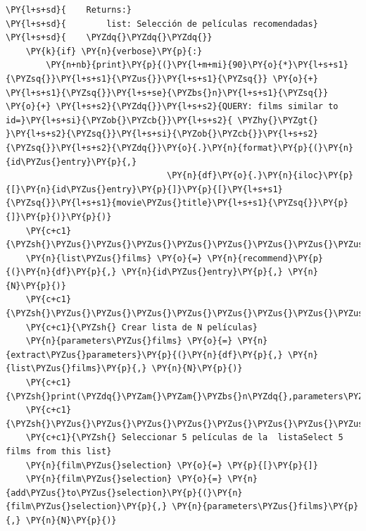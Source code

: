 \begin{tcolorbox}[breakable, size=fbox, boxrule=1pt, pad at break*=1mm,colback=cellbackground, colframe=cellborder]
\begin{Verbatim}[commandchars=\\\{\}]
\PY{l+s+sd}{    Returns:}
\PY{l+s+sd}{        list: Selección de películas recomendadas}
\PY{l+s+sd}{    \PYZdq{}\PYZdq{}\PYZdq{}}
    \PY{k}{if} \PY{n}{verbose}\PY{p}{:} 
        \PY{n+nb}{print}\PY{p}{(}\PY{l+m+mi}{90}\PY{o}{*}\PY{l+s+s1}{\PYZsq{}}\PY{l+s+s1}{\PYZus{}}\PY{l+s+s1}{\PYZsq{}} \PY{o}{+} \PY{l+s+s1}{\PYZsq{}}\PY{l+s+se}{\PYZbs{}n}\PY{l+s+s1}{\PYZsq{}} \PY{o}{+} \PY{l+s+s2}{\PYZdq{}}\PY{l+s+s2}{QUERY: films similar to id=}\PY{l+s+si}{\PYZob{}\PYZcb{}}\PY{l+s+s2}{ \PYZhy{}\PYZgt{} }\PY{l+s+s2}{\PYZsq{}}\PY{l+s+si}{\PYZob{}\PYZcb{}}\PY{l+s+s2}{\PYZsq{}}\PY{l+s+s2}{\PYZdq{}}\PY{o}{.}\PY{n}{format}\PY{p}{(}\PY{n}{id\PYZus{}entry}\PY{p}{,}
                                \PY{n}{df}\PY{o}{.}\PY{n}{iloc}\PY{p}{[}\PY{n}{id\PYZus{}entry}\PY{p}{]}\PY{p}{[}\PY{l+s+s1}{\PYZsq{}}\PY{l+s+s1}{movie\PYZus{}title}\PY{l+s+s1}{\PYZsq{}}\PY{p}{]}\PY{p}{)}\PY{p}{)}
    \PY{c+c1}{\PYZsh{}\PYZus{}\PYZus{}\PYZus{}\PYZus{}\PYZus{}\PYZus{}\PYZus{}\PYZus{}\PYZus{}\PYZus{}\PYZus{}\PYZus{}\PYZus{}\PYZus{}\PYZus{}\PYZus{}\PYZus{}\PYZus{}\PYZus{}\PYZus{}\PYZus{}\PYZus{}\PYZus{}\PYZus{}\PYZus{}\PYZus{}\PYZus{}\PYZus{}\PYZus{}\PYZus{}\PYZus{}\PYZus{}\PYZus{}\PYZus{}\PYZus{}\PYZus{}}
    \PY{n}{list\PYZus{}films} \PY{o}{=} \PY{n}{recommend}\PY{p}{(}\PY{n}{df}\PY{p}{,} \PY{n}{id\PYZus{}entry}\PY{p}{,} \PY{n}{N}\PY{p}{)}
    \PY{c+c1}{\PYZsh{}\PYZus{}\PYZus{}\PYZus{}\PYZus{}\PYZus{}\PYZus{}\PYZus{}\PYZus{}\PYZus{}\PYZus{}\PYZus{}\PYZus{}\PYZus{}\PYZus{}\PYZus{}\PYZus{}\PYZus{}\PYZus{}\PYZus{}\PYZus{}\PYZus{}\PYZus{}\PYZus{}\PYZus{}\PYZus{}\PYZus{}\PYZus{}\PYZus{}\PYZus{}\PYZus{}\PYZus{}\PYZus{}\PYZus{}\PYZus{}}
    \PY{c+c1}{\PYZsh{} Crear lista de N películas}
    \PY{n}{parameters\PYZus{}films} \PY{o}{=} \PY{n}{extract\PYZus{}parameters}\PY{p}{(}\PY{n}{df}\PY{p}{,} \PY{n}{list\PYZus{}films}\PY{p}{,} \PY{n}{N}\PY{p}{)}
    \PY{c+c1}{\PYZsh{}print(\PYZdq{}\PYZam{}\PYZam{}\PYZbs{}n\PYZdq{},parameters\PYZus{}films)}
    \PY{c+c1}{\PYZsh{}\PYZus{}\PYZus{}\PYZus{}\PYZus{}\PYZus{}\PYZus{}\PYZus{}\PYZus{}\PYZus{}\PYZus{}\PYZus{}\PYZus{}\PYZus{}\PYZus{}\PYZus{}\PYZus{}\PYZus{}\PYZus{}\PYZus{}\PYZus{}\PYZus{}\PYZus{}\PYZus{}\PYZus{}\PYZus{}\PYZus{}\PYZus{}\PYZus{}\PYZus{}\PYZus{}\PYZus{}\PYZus{}\PYZus{}\PYZus{}\PYZus{}\PYZus{}\PYZus{}\PYZus{}\PYZus{}}
    \PY{c+c1}{\PYZsh{} Seleccionar 5 películas de la  listaSelect 5 films from this list}
    \PY{n}{film\PYZus{}selection} \PY{o}{=} \PY{p}{[}\PY{p}{]}
    \PY{n}{film\PYZus{}selection} \PY{o}{=} \PY{n}{add\PYZus{}to\PYZus{}selection}\PY{p}{(}\PY{n}{film\PYZus{}selection}\PY{p}{,} \PY{n}{parameters\PYZus{}films}\PY{p}{,} \PY{n}{N}\PY{p}{)}

\end{Verbatim}
\end{tcolorbox}
